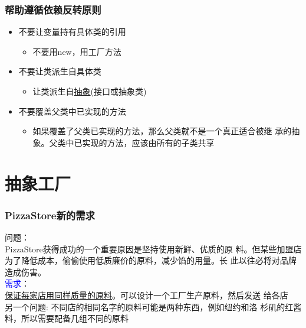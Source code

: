 \documentclass[compress]{beamer}
\newcommand{\textblue}[1]{\textcolor{blue}{#1}}
\begin{document}
\begin{frame}
  \frametitle{帮助遵循依赖反转原则}
  \begin{itemize}
    \item 不要让变量持有具体类的引用
      \begin{itemize}
        \item 不要用new，用工厂方法
      \end{itemize}
    \item 不要让类派生自具体类
      \begin{itemize}
        \item 让类派生自\uline{抽象}(接口或抽象类)
      \end{itemize}
    \item 不要覆盖父类中已实现的方法
      \begin{itemize}
        \item 如果覆盖了父类已实现的方法，那么父类就不是一个真正适合被继
          承的抽象。父类中已实现的方法，应该由所有的子类共享
      \end{itemize}
  \end{itemize}
\end{frame}

\section{抽象工厂}

\begin{frame}
  \frametitle{PizzaStore新的需求}

  \alert{问题}： \\
  PizzaStore获得成功的一个重要原因是坚持使用新鲜、优质的原
  料。但某些加盟店为了降低成本，偷偷使用低质廉价的原料，减少馅的用量。长
  此以往必将对品牌造成伤害。 \\[3ex]
  \textblue{需求}：\\
  \uline{保证每家店用同样质量的原料}。可以设计一个工厂生产原料，然后发送
  给各店 \\
  \alert{另一个问题:} 不同店的相同名字的原料可能是两种东西，例如纽约和洛
  杉矶的红酱料，所以需要配备几组不同的原料

\end{frame}
\end{document}
